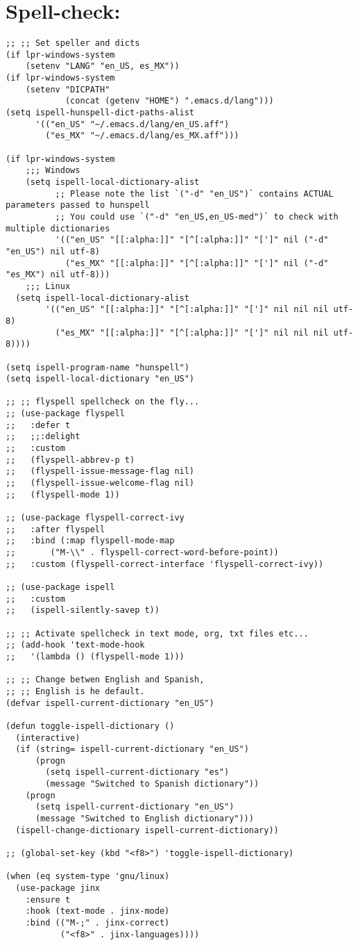 \documentclass[11pt]{article}
\begin{document}
\section{Spell-check:}
\label{sec:orgc1b057f}
\begin{verbatim}
;; ;; Set speller and dicts
(if lpr-windows-system
    (setenv "LANG" "en_US, es_MX"))
(if lpr-windows-system
    (setenv "DICPATH"
            (concat (getenv "HOME") ".emacs.d/lang")))
(setq ispell-hunspell-dict-paths-alist
      '(("en_US" "~/.emacs.d/lang/en_US.aff")
        ("es_MX" "~/.emacs.d/lang/es_MX.aff")))

(if lpr-windows-system
    ;;; Windows
    (setq ispell-local-dictionary-alist
          ;; Please note the list `("-d" "en_US")` contains ACTUAL parameters passed to hunspell
          ;; You could use `("-d" "en_US,en_US-med")` to check with multiple dictionaries
          '(("en_US" "[[:alpha:]]" "[^[:alpha:]]" "[']" nil ("-d" "en_US") nil utf-8)
            ("es_MX" "[[:alpha:]]" "[^[:alpha:]]" "[']" nil ("-d" "es_MX") nil utf-8)))
    ;;; Linux
  (setq ispell-local-dictionary-alist
        '(("en_US" "[[:alpha:]]" "[^[:alpha:]]" "[']" nil nil nil utf-8)
          ("es_MX" "[[:alpha:]]" "[^[:alpha:]]" "[']" nil nil nil utf-8))))

(setq ispell-program-name "hunspell")
(setq ispell-local-dictionary "en_US")

;; ;; flyspell spellcheck on the fly...
;; (use-package flyspell
;;   :defer t
;;   ;;:delight
;;   :custom
;;   (flyspell-abbrev-p t)
;;   (flyspell-issue-message-flag nil)
;;   (flyspell-issue-welcome-flag nil)
;;   (flyspell-mode 1))

;; (use-package flyspell-correct-ivy
;;   :after flyspell
;;   :bind (:map flyspell-mode-map
;;       ("M-\\" . flyspell-correct-word-before-point))
;;   :custom (flyspell-correct-interface 'flyspell-correct-ivy))

;; (use-package ispell
;;   :custom
;;   (ispell-silently-savep t))

;; ;; Activate spellcheck in text mode, org, txt files etc...
;; (add-hook 'text-mode-hook
;;   '(lambda () (flyspell-mode 1)))

;; ;; Change betwen English and Spanish, 
;; ;; English is he default.
(defvar ispell-current-dictionary "en_US")

(defun toggle-ispell-dictionary ()
  (interactive)
  (if (string= ispell-current-dictionary "en_US")
      (progn
        (setq ispell-current-dictionary "es")
        (message "Switched to Spanish dictionary"))
    (progn
      (setq ispell-current-dictionary "en_US")
      (message "Switched to English dictionary")))
  (ispell-change-dictionary ispell-current-dictionary))

;; (global-set-key (kbd "<f8>") 'toggle-ispell-dictionary)

(when (eq system-type 'gnu/linux)
  (use-package jinx
    :ensure t
    :hook (text-mode . jinx-mode)
    :bind (("M-;" . jinx-correct)
           ("<f8>" . jinx-languages))))
\end{verbatim}
\end{document}
